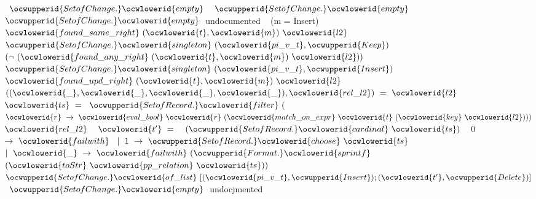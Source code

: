 \documentclass[12pt]{article}
\begin{document}
\ocwindent{6.00em}
~$\ocwupperid{SetofChange.}\ocwlowerid{empty}~$\ocweol
\ocwindent{5.00em}
~$\ocwupperid{SetofChange.}\ocwlowerid{empty}~$\ocweol
\ocwindent{4.00em}
~$\ocwupperid{SetofChange.}\ocwlowerid{empty}~$\ocwbc{} undocumented \ocwec{}\ocweol
\ocwindent{3.00em}
~\ocwbc{} (m = Insert) \ocwec{}\ocweol
\ocwindent{4.00em}
~$\ocwlowerid{found\_same\_right}~(\ocwlowerid{t},\ocwlowerid{m})~\ocwlowerid{l2}~$\ocweol
\ocwindent{5.00em}
$\ocwupperid{SetofChange.}\ocwlowerid{singleton}~(\ocwlowerid{pi\_v\_t},\ocwupperid{Keep})$\ocweol
\ocwindent{4.00em}
~~$(\lnot{}~(\ocwlowerid{found\_any\_right}~(\ocwlowerid{t},\ocwlowerid{m})~\ocwlowerid{l2}))~$~$\ocwupperid{SetofChange.}\ocwlowerid{singleton}~(\ocwlowerid{pi\_v\_t},\ocwupperid{Insert})$\ocweol
\ocwindent{4.00em}
~~$\ocwlowerid{found\_upd\_right}~(\ocwlowerid{t},\ocwlowerid{m})~\ocwlowerid{l2}~$\ocweol
\ocwindent{5.00em}
~$((\ocwlowerid{\_},\ocwlowerid{\_},\ocwlowerid{\_},\ocwlowerid{\_}),\ocwlowerid{rel\_l2})~=~\ocwlowerid{l2}~$\ocweol
\ocwindent{5.00em}
~$\ocwlowerid{ts}~=~$\ocweol
\ocwindent{6.00em}
$\ocwupperid{SetofRecord.}\ocwlowerid{filter}~($~$\ocwlowerid{r}~\rightarrow{}~\ocwlowerid{eval\_bool}~\ocwlowerid{r}~(\ocwlowerid{match\_on\_expr}~\ocwlowerid{t}~(\ocwlowerid{key}~\ocwlowerid{l2})))$\ocweol
\ocwindent{7.00em}
$\ocwlowerid{rel\_l2}~$\ocweol
\ocwindent{5.00em}
~$\ocwlowerid{t'}~=~$\ocweol
\ocwindent{6.00em}
~$(\ocwupperid{SetofRecord.}\ocwlowerid{cardinal}~\ocwlowerid{ts})~$~\ocweol
\ocwindent{7.00em}
0~$\rightarrow{}~\ocwlowerid{failwith}~$\ocweol
\ocwindent{6.00em}
$\mid{}~1~\rightarrow{}~\ocwupperid{SetofRecord.}\ocwlowerid{choose}~\ocwlowerid{ts}~$\ocweol
\ocwindent{6.00em}
$\mid{}~\ocwlowerid{\_}~\rightarrow{}~\ocwlowerid{failwith}~(\ocwupperid{Format.}\ocwlowerid{sprintf}~$\ocweol
\ocwindent{11.50em}
$(\ocwlowerid{toStr}~\ocwlowerid{pp\_relation}~\ocwlowerid{ts}))~$\ocweol
\ocwindent{5.00em}
$\ocwupperid{SetofChange.}\ocwlowerid{of\_list}~[(\ocwlowerid{pi\_v\_t},\ocwupperid{Insert});(\ocwlowerid{t'},\ocwupperid{Delete})]$\ocweol
\ocwindent{4.00em}
~$\ocwupperid{SetofChange.}\ocwlowerid{empty}~$\ocwbc{} undocjmented \ocwec{}\medskip
\end{document}
